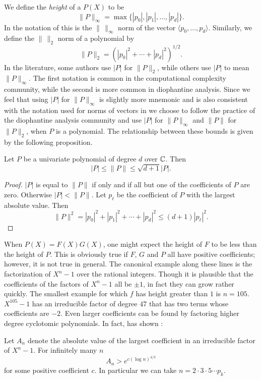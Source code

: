 We define the {\em height} of a $P(X)$ to be 
\[
\|P \|_{\infty} = 
  \max \{\left|p_{0}\right|, \left|p_{1}\right|, \ldots, \left|p_{d}\right|\}.
\]
In the notation of  this is the $\|\,\|_{\infty}$ norm
of the vector $\langle p_{0},\ldots, p_{d}\rangle$.  Similarly, we define the
$\|\,\|_{2}$ norm of a polynomial by
\[
\|P \|_{2} = \left(\left|p_{0}\right|^{2} + \cdots +
    \left|p_{d}\right|^{2}\right)^{1/2}.
\]
In the literature, some authors use $|P|$ for $\|P\|_{2}$, while
others use $|P|$ to mean $\|P\|_{\infty}$.  The first notation is
common in the computational complexity community, while the second is
more common in diophantine analysis.  Since we feel that using $|P|$
for $\|P\|_{\infty}$ is slightly more mnemonic and is also consistent
with the notation used for norms of vectors in 
we choose to follow the practice of the diophantine analysis community
and use $|P|$ for $\|P\|_{\infty}$ and $\|P\|$ for $\|P\|_{2}$, when
$P$ is a polynomial.  The relationship between these bounds is given
by the following proposition.

\begin{proposition}\label{PB:HeightRel:Prop}
Let $P$ be a univariate polynomial of degree $d$ over $\mathbb{C}$.  Then
\[
|P| \le \|P\| \le \sqrt{d+1} |P|.
\]
\end{proposition}

\begin{proof}
$|P|$ is equal to $\|P\|$ if only and if all but one of the coefficients
of $P$ are zero.  Otherwise $|P| < \|P\|$.  Let $p_{\ell}$ be the
coefficient of $P$ with the largest absolute value. Then
\[
\|P\|^2 = |p_0|^2 + |p_1|^2 + \cdots + |p_d|^2 \le (d+1) |p_{\ell}|^2.
\]
\end{proof}

When $P(X) = F(X) G(X)$, one might expect the height of $F$ to be less
than the height of $P$.  This is obviously true if $F$, $G$ and $P$
all have positive coefficients; however, it is not true in general.
The canonical example along these lines is the factorization of
$X^{n}-1$ over the rational integers.  Though it is plausible that the
coefficients of the factors of $X^{n}-1$ all be $\pm1$, in fact they
can grow rather quickly. The smallest example for which $f$ has height
greater than $1$ is $n=105$.  $X^{105}-1$ has an irreducible factor of
degree $47$ that has two terms whose coefficients are $-2$.  Even
larger coefficients can be found by factoring higher degree cyclotomic
polynomials. In fact, {\Erdos} has shown \cite{Erdos1946-ns}:
\begin{proposition} [\Erdos]
Let $A_n$ denote the absolute value of the largest coefficient in an
irreducible factor of $X^n -1$.  For infinitely many $n$
\[
A_n > e^{c (\log n)^{4/3}}
\]
for some positive coefficient $c$.  In particular we can take $n = 2
\cdot 3 \cdot 5 \cdots p_k$.
\end{proposition}

